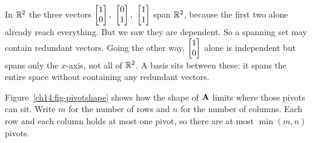 \begin{example}
\label{ch14:ex-span-not-indep}
In $\mathbb{R}^2$ the three vectors $\colvec{1\\0},\ \colvec{0\\1},\ \colvec{1\\1}$ span
$\mathbb{R}^2$, because the first two alone already reach everything. But we saw they are
dependent. So a spanning set may contain redundant vectors. Going the other way,
$\begin{bmatrix}1\\0\end{bmatrix}$ alone is independent but spans only the $x$-axis, not all of
$\mathbb{R}^2$. A basis sits between these: it spans the entire space without
containing any redundant vectors.
\end{example}

Figure~\ref{ch14:fig-pivotshape} shows how the shape of $\mathbf{A}$ limits where
those pivots can sit. Write $m$ for the number of rows and $n$ for the number of columns.
Each row and each column holds at most one pivot, so there are at most
$\min(m,n)$ pivots.

